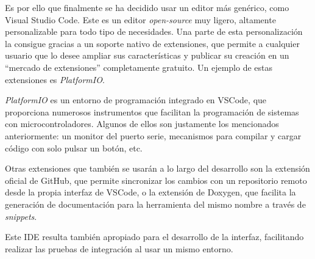 Es por ello que finalmente se ha decidido usar un editor más genérico, como Visual Studio Code. Este es un editor \textit{open-source} muy ligero, altamente personalizable para todo tipo de necesidades. Una parte de esta personalización la consigue gracias a un soporte nativo de extensiones, que permite a cualquier usuario que lo desee ampliar sus características y publicar su creación en un ``mercado de extensiones'' completamente gratuito. Un ejemplo de estas extensiones es \textit{PlatformIO}.

\textit{PlatformIO} es un entorno de programación integrado en VSCode, que proporciona numerosos instrumentos que facilitan la programación de sistemas con microcontroladores. Algunos de ellos son justamente los mencionados anteriormente: un monitor del puerto serie, mecanismos para compilar y cargar código con solo pulsar un botón, etc.

Otras extensiones que también se usarán a lo largo del desarrollo son la extensión oficial de GitHub, que permite sincronizar los cambios con un repositorio remoto desde la propia interfaz de VSCode, o la extensión de Doxygen, que facilita la generación de documentación para la herramienta del mismo nombre a través de \textit{snippets}.

Este IDE resulta también apropiado para el desarrollo de la interfaz, facilitando realizar las pruebas de integración al usar un mismo entorno.
